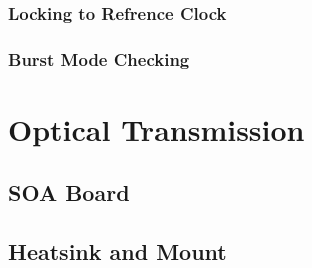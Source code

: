 \subsubsection{Locking to Refrence Clock}%
\label{ssub:locking_to_refrence_clock}

\subsubsection{Burst Mode Checking}%
\label{ssub:burst_mode_checking}

\section{Optical Transmission}%
\label{optical_transmission}

\subsection{SOA Board}%
\label{sub:soa_board}

\subsection{Heatsink and Mount}%
\label{sub:heatsink_and_mount}





